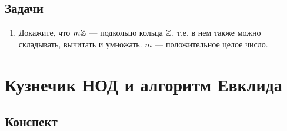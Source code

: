 \subsection{Задачи}
\begin{enumerate}
\item Докажите, что $m\mathbb Z$ --- подкольцо кольца $\mathbb Z$, т.е. в нем также можно складывать, вычитать и умножать. $m$ --- положительное целое число.
\end{enumerate}

\section{Кузнечик НОД и алгоритм Евклида}

\subsection{Конспект}
